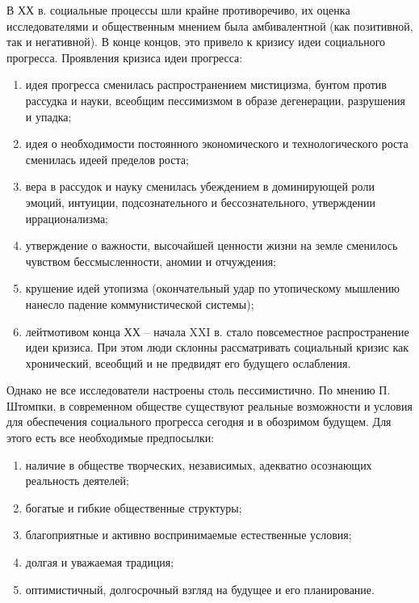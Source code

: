 \documentclass[12pt]{article}
\begin{document}
В  ХХ  в.  социальные  процессы  шли  крайне  противоречиво,  их  оценка  исследователями  и  общественным
мнением была амбивалентной (как позитивной, так и негативной). В конце концов, это привело к кризису идеи
социального прогресса.
Проявления  кризиса  идеи  прогресса:
\begin{enumerate}
\item  идея  прогресса  сменилась  распространением  мистицизма,  бунтом
против  рассудка  и  науки,  всеобщим  пессимизмом  в  образе  дегенерации,  разрушения  и  упадка;
\item идея  о
необходимости постоянного экономического и технологического роста сменилась идеей пределов роста;
\item вера
в  рассудок  и  науку  сменилась  убеждением  в  доминирующей  роли  эмоций,  интуиции,  подсознательного  и
бессознательного, утверждении иррационализма;
\item утверждение о важности, высочайшей ценности жизни на
земле  сменилось  чувством  бессмысленности,  аномии  и  отчуждения;  
\item  крушение  идей  утопизма
(окончательный  удар  по  утопическому  мышлению  нанесло  падение  коммунистической  системы);  
\item лейтмотивом конца ХХ – начала XXI в. стало повсеместное распространение идеи кризиса. При этом люди
склонны  рассматривать  социальный  кризис  как  хронический,  всеобщий  и  не  предвидят  его  будущего
ослабления.
\end{enumerate}
Однако  не  все  исследователи  настроены  столь  пессимистично.  По  мнению  П.  Штомпки,  в  современном
обществе существуют реальные возможности и условия для обеспечения социального прогресса сегодня и в
обозримом  будущем.  Для  этого  есть  все  необходимые  предпосылки:
\begin{enumerate}
  \item наличие  в  обществе  творческих,
независимых, адекватно осознающих реальность деятелей;
\item богатые и гибкие общественные структуры;
\item благоприятные  и  активно  воспринимаемые  естественные  условия;
\item  долгая  и  уважаемая  традиция;
\item оптимистичный, долгосрочный взгляд на будущее и его планирование. 
\end{enumerate}

\newpage
\end{document}
